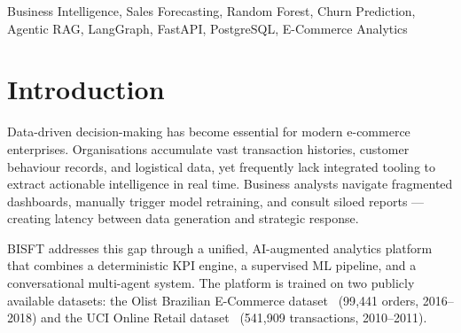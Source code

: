 \documentclass[conference]{IEEEtran}
\begin{document}
\begin{abstract}
This paper presents the BISFT platform, an AI-driven business intelligence system that
unifies a Random Forest revenue forecasting pipeline, a DNN churn predictor, eleven
deterministic analytical tools, and a LangGraph multi-agent AI consultant within a single
full-stack web application.  The system ingests two heterogeneous e-commerce datasets through
a bespoke PostgreSQL ETL pipeline, exposes 15+ REST endpoints via FastAPI, and renders results
through a React~18 dashboard.  The Random Forest model achieves MAPE~22.4\% and
$R^{2}\!=\!0.87$ on the held-out test set; the DNN churn model achieves AUC-ROC~0.82.
The Agentic RAG consultant successfully handles multi-step analytical queries through
coordinated tool use, semantic retrieval, and Llama~3.3~70B synthesis.
\end{abstract}

\begin{IEEEkeywords}
Business Intelligence, Sales Forecasting, Random Forest, Churn Prediction,
Agentic RAG, LangGraph, FastAPI, PostgreSQL, E-Commerce Analytics
\end{IEEEkeywords}

\section{Introduction}

Data-driven decision-making has become essential for modern e-commerce enterprises.
Organisations accumulate vast transaction histories, customer behaviour records, and logistical
data, yet frequently lack integrated tooling to extract actionable intelligence in real time.
Business analysts navigate fragmented dashboards, manually trigger model retraining, and consult
siloed reports — creating latency between data generation and strategic response.

BISFT addresses this gap through a unified, AI-augmented analytics platform that combines a
deterministic KPI engine, a supervised ML pipeline, and a conversational multi-agent system.
The platform is trained on two publicly available datasets: the Olist Brazilian E-Commerce
dataset~\cite{olist2018} (99{,}441 orders, 2016–2018) and the UCI Online Retail
dataset~\cite{online_retail2015} (541{,}909 transactions, 2010–2011).
\end{document}
